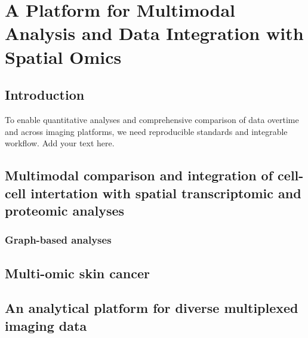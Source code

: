 \chapter[A Platform for Multimodal Analysis and Data Integration with Spatial Omics]{A Platform for Multimodal Analysis and Data Integration with Spatial Omics}
\label{Chap:4}	%
\pagestyle{headings}
\section{Introduction}
\label{Sec:4.1_intro}	%
To enable quantitative analyses and comprehensive comparison of data overtime and across imaging platforms, we need reproducible standards and integrable workflow.   
Add your text here. 

\section{Multimodal comparison and integration of cell-cell intertation with spatial transcriptomic and proteomic analyses}
\label{Sec:4.2_Cell_communities}	%
\subsection{Graph-based analyses}
\subsection{}

\subsection{}
\section{Multi-omic skin cancer}



\section{An analytical platform for diverse multiplexed imaging data}
\label{Sec:4.3_quantitative_validation}	%
\subsection{}



